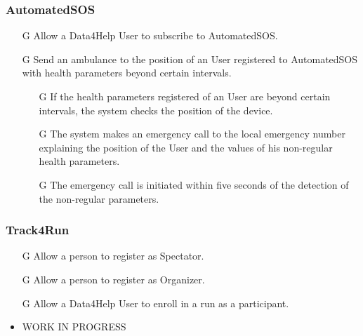 \documentclass[../../rasd.tex]{subfiles}
\begin{document}
				\subsubsection{AutomatedSOS}
					\begin{itemize}
						\item[G\subs{8}]Allow a Data4Help User to subscribe to AutomatedSOS.
						\item[G\subs{9}]Send an ambulance to the position of an User registered to AutomatedSOS with health parameters beyond certain intervals.
					\begin{itemize}
						\item[G\subs{9.1}]If the health parameters registered of an User are beyond certain intervals, the system checks the position of the device.
						\item[G\subs{9.2}]The system makes an emergency call to the local emergency number explaining the position of the User and the values of his non-regular health parameters.
						\item[G\subs{9.3}]The emergency call is initiated within five seconds of the detection of the non-regular parameters.
					\end{itemize}
					\end{itemize}
				\subsubsection{Track4Run}
					\begin{itemize}
						\item[G\subs{10}]Allow a person to register as Spectator.
						\item[G\subs{11}]Allow a person to register as Organizer.
						\item[G\subs{12}]Allow a Data4Help User to enroll in a run as a participant.
					\end{itemize}
			\begin{itemize}					
				\item WORK IN PROGRESS
			\end{itemize}
			
			
\end{document}
